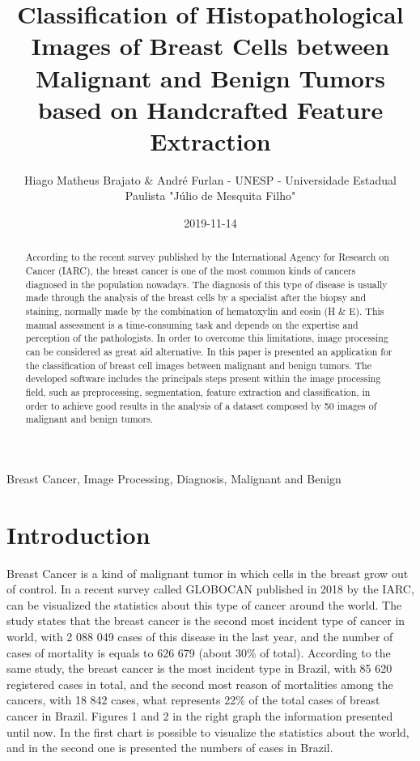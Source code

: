 \documentclass[conference]{IEEEtran}
\begin{document}
\title{Classification of Histopathological Images of Breast Cells between Malignant and Benign Tumors based on Handcrafted Feature Extraction}
\author{Hiago Matheus Brajato \& André Furlan - UNESP - Universidade Estadual Paulista "Júlio de Mesquita Filho"}
\date{2019-11-14}
\maketitle

\begin{abstract}
According to the recent survey published by the International Agency for Research on Cancer (IARC), the breast cancer is one of the most common kinds of cancers diagnosed in the population nowadays. The diagnosis of this type of disease is usually made through the analysis of the breast cells by a specialist after the biopsy and staining, normally made by the combination of hematoxylin and eosin (H \& E). This manual assessment is a time-consuming task and depends on the expertise and perception of the pathologists. In order to overcome this limitations, image processing can be considered as great aid alternative. In this paper is presented an application for the classification of breast cell images between malignant and benign tumors. The developed software includes the principals steps present within the image processing field, such as preprocessing, segmentation, feature extraction and classification, in order to achieve good results in the analysis of a dataset composed by 50 images of malignant and benign tumors.
\end{abstract}

\begin{IEEEkeywords}
Breast Cancer, Image Processing, Diagnosis, Malignant and Benign
\end{IEEEkeywords}

\section{Introduction}
Breast Cancer is a kind of malignant tumor in which cells in the breast grow out of control. In a recent survey called GLOBOCAN \cite{GLOBOCAN} published in 2018 by the IARC, can be visualized the statistics about this type of cancer around the world. The study states that the breast cancer is the second most incident type of cancer in world, with 2 088 049 cases of this disease in the last year, and the number of cases of mortality is equals to 626 679 (about 30\% of total). According to the same study, the breast cancer is the most incident type in Brazil, with 85 620 registered cases in total, and the second most reason of mortalities among the cancers, with 18 842 cases, what represents 22\% of the total cases of breast cancer in Brazil. Figures 1 and 2 in the right graph the information presented until now. In the first chart is possible to visualize the statistics about the world, and in the second one is presented the numbers of cases in Brazil.
\end{document}
